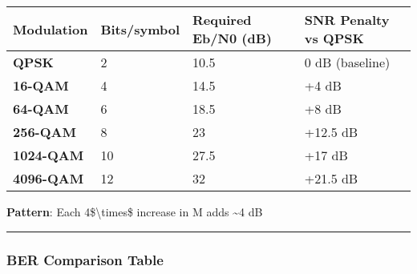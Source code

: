 {\def\LTcaptype{} %
\begin{longtable}[]{@{}llll@{}}
\toprule\noalign{}
Modulation & Bits/symbol & Required Eb/N0 (dB) & SNR Penalty vs QPSK \\
\midrule\noalign{}
\endhead
\bottomrule\noalign{}
\endlastfoot
\textbf{QPSK} & 2 & 10.5 & 0 dB (baseline) \\
\textbf{16-QAM} & 4 & 14.5 & +4 dB \\
\textbf{64-QAM} & 6 & 18.5 & +8 dB \\
\textbf{256-QAM} & 8 & 23 & +12.5 dB \\
\textbf{1024-QAM} & 10 & 27.5 & +17 dB \\
\textbf{4096-QAM} & 12 & 32 & +21.5 dB \\
\end{longtable}
}

\textbf{Pattern}: Each 4\$\textbackslash times\$ increase in M adds
\textasciitilde4 dB

\begin{center}\rule{0.5\linewidth}{0.5pt}\end{center}

\subsubsection{BER Comparison Table}\label{ber-comparison-table}

